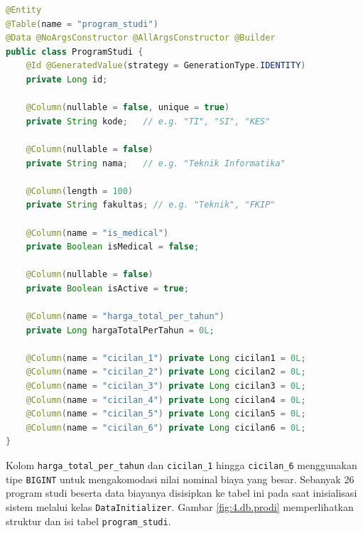 \begin{lstlisting}[language=Java, caption={Entitas ProgramStudi dengan kolom harga dan cicilan per tahap}, label={kode:4.entitas_prodi}]
@Entity
@Table(name = "program_studi")
@Data @NoArgsConstructor @AllArgsConstructor @Builder
public class ProgramStudi {
    @Id @GeneratedValue(strategy = GenerationType.IDENTITY)
    private Long id;

    @Column(nullable = false, unique = true)
    private String kode;   // e.g. "TI", "SI", "KES"

    @Column(nullable = false)
    private String nama;   // e.g. "Teknik Informatika"

    @Column(length = 100)
    private String fakultas; // e.g. "Teknik", "FKIP"

    @Column(name = "is_medical")
    private Boolean isMedical = false;

    @Column(nullable = false)
    private Boolean isActive = true;

    @Column(name = "harga_total_per_tahun")
    private Long hargaTotalPerTahun = 0L;

    @Column(name = "cicilan_1") private Long cicilan1 = 0L;
    @Column(name = "cicilan_2") private Long cicilan2 = 0L;
    @Column(name = "cicilan_3") private Long cicilan3 = 0L;
    @Column(name = "cicilan_4") private Long cicilan4 = 0L;
    @Column(name = "cicilan_5") private Long cicilan5 = 0L;
    @Column(name = "cicilan_6") private Long cicilan6 = 0L;
}
\end{lstlisting}

Kolom \texttt{harga\_total\_per\_tahun} dan \texttt{cicilan\_1} hingga \texttt{cicilan\_6} menggunakan tipe \texttt{BIGINT} untuk mengakomodasi nilai nominal biaya yang besar. Sebanyak 26 program studi beserta data biayanya disisipkan ke tabel ini pada saat inisialisasi sistem melalui kelas \texttt{DataInitializer}. Gambar \ref{fig:4.db.prodi} memperlihatkan struktur dan isi tabel \texttt{program\_studi}.\par


